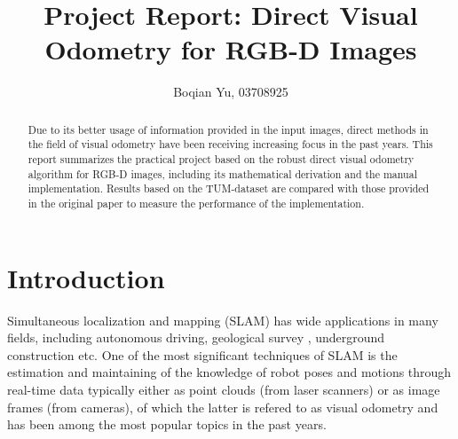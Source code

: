 \documentclass[acmsmall, nonacm, 11pt]{acmart}
\begin{document}
\title{Project Report: Direct Visual Odometry for RGB-D Images}

\author{Boqian Yu, 03708925}

\renewcommand{\shortauthors}{Boqian Yu}

\begin{abstract}
  Due to its better usage of information provided in the input images, direct methods in the field of visual odometry have been receiving increasing focus in the past years. This report summarizes the practical project based on the robust direct visual odometry algorithm for RGB-D images, including its mathematical derivation and the manual implementation. Results based on the TUM-dataset are compared with those provided in the original paper to measure the performance of the implementation.
\end{abstract}

\makeatletter
\let\@authorsaddresses\@empty
\makeatother

\maketitle

\section{Introduction}
Simultaneous localization and mapping (SLAM) has wide applications in many fields, including autonomous driving\cite{levinson2011automatic}, geological survey \cite{kraus1998determination}, underground construction \cite{nuchter20046d} \cite{pejic2013design} etc. One of the most significant techniques of SLAM is the estimation and maintaining of the knowledge of robot poses and motions through real-time data typically either as point clouds (from laser scanners) or as image frames (from cameras), of which the latter is refered to as visual odometry and has been among the most popular topics in the past years.
\end{document}
